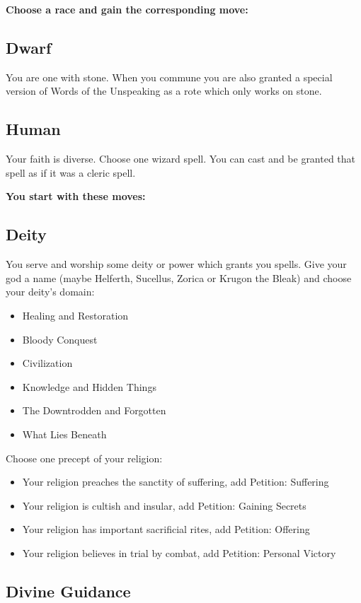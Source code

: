 {\bfseries Choose a race and gain the corresponding move:}
\subsection{Dwarf}


 You are one with stone. When you commune you are also granted a special version of Words of the Unspeaking as a rote which only works on stone.
\subsection{Human}


 Your faith is diverse. Choose one wizard spell. You can cast and be granted that spell as if it was a cleric spell.


\vspace{\baselineskip}
{\bfseries You start with these moves:}
\subsection{Deity}


 You serve and worship some deity or power which grants you spells. Give your god a name (maybe Helferth, Sucellus, Zorica or Krugon the Bleak) and choose your deity's domain:
\begin{itemize}
\item Healing and Restoration
\item Bloody Conquest
\item Civilization
\item Knowledge and Hidden Things
\item The Downtrodden and Forgotten
\item What Lies Beneath

\end{itemize}


 Choose one precept of your religion:
\begin{itemize}
\item Your religion preaches the sanctity of suffering, add Petition: Suffering
\item Your religion is cultish and insular, add Petition: Gaining Secrets
\item Your religion has important sacrificial rites, add Petition: Offering
\item Your religion believes in trial by combat, add Petition: Personal Victory

\end{itemize}
\subsection{Divine Guidance}


